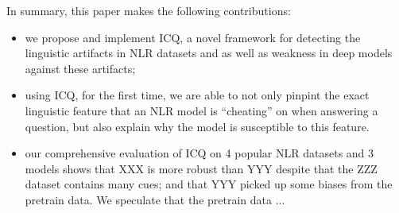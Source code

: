 In summary, this paper makes the following contributions:
\begin{itemize}
\item we propose and implement ICQ, a novel framework for detecting
the linguistic artifacts in NLR datasets and as well as weakness
in deep models against these artifacts;

\item using ICQ, for the first time, 
we are able to not only pinpint the exact linguistic feature that
an NLR model is ``cheating'' on when answering a question,
but also explain why the model is susceptible to this feature.



\item our comprehensive evaluation of ICQ on 4 popular NLR datasets and 
3 models shows that XXX is more robust than YYY despite that the ZZZ dataset
contains many cues; and that YYY picked up some biases from the pretrain data. 
We speculate that the pretrain data ...
\end{itemize}


